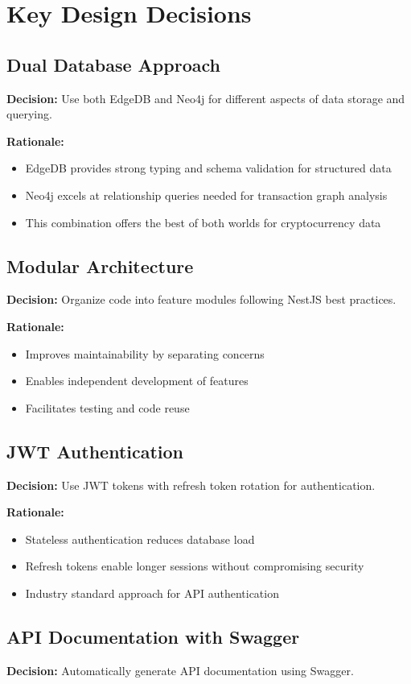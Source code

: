 \section{Key Design Decisions}
\subsection{Dual Database Approach}
\textbf{Decision:} Use both EdgeDB and Neo4j for different aspects of data storage and querying.

\textbf{Rationale:}
\begin{itemize}
\item EdgeDB provides strong typing and schema validation for structured data
\item Neo4j excels at relationship queries needed for transaction graph analysis
\item This combination offers the best of both worlds for cryptocurrency data
\end{itemize}
\subsection{Modular Architecture}
\textbf{Decision:} Organize code into feature modules following NestJS best practices.

\textbf{Rationale:}
\begin{itemize}
\item Improves maintainability by separating concerns
\item Enables independent development of features
\item Facilitates testing and code reuse
\end{itemize}
\subsection{JWT Authentication}
\textbf{Decision:} Use JWT tokens with refresh token rotation for authentication.

\textbf{Rationale:}
\begin{itemize}
\item Stateless authentication reduces database load
\item Refresh tokens enable longer sessions without compromising security
\item Industry standard approach for API authentication
\end{itemize}
\subsection{API Documentation with Swagger}
\textbf{Decision:} Automatically generate API documentation using Swagger.

